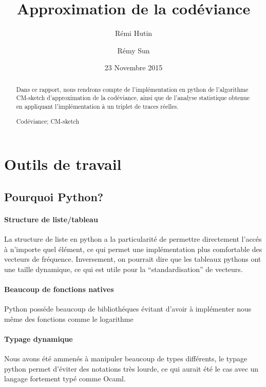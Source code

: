 \documentclass[a4paper,11pt]{article}%
\newenvironment{keywords}%
{\description\item[Mots-clés.]}%
{\enddescription}
\begin{document}
\title{Approximation de la codéviance}

\author{Rémi Hutin \and Rémy Sun}

\date{23 Novembre 2015}

\maketitle

\begin{abstract}
  Dans ce rapport, nous rendrons compte de l'implémentation en python de l'algorithme CM-sketch d'approximation de la codéviance, ainsi que de l'analyse statistique obtenue
  en appliquant l'implémentation à un triplet de traces réelles.
\begin{keywords}
  Codéviance; CM-sketch
\end{keywords}
\end{abstract}

\section{Outils de travail}
\label{sec:outils}

\subsection{Pourquoi Python?}

\paragraph{Structure de liste/tableau}La structure de liste en python a la particularité de permettre directement l'accés à n'importe quel élément, ce qui permet une implémentation plus comfortable des vecteurs de fréquence.
Inversement, on pourrait dire que les tableaux pythons ont une taille dynamique, ce qui est utile pour la ``standardisation'' de vecteurs.

\paragraph{Beaucoup de fonctions natives}Python posséde beaucoup de bibliothéques évitant d'avoir à implémenter nous même des fonctions comme le logarithme

\paragraph{Typage dynamique}Nous avons été ammenés à manipuler beaucoup de types différents, le typage python permet d'éviter des notations très lourde, ce qui aurait été le cas avec un langage fortement typé comme Ocaml.
\end{document}
